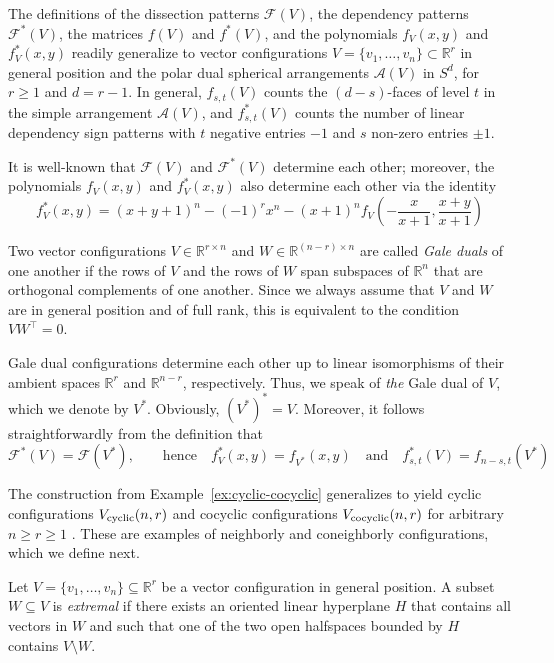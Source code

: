 \documentclass[a4paper,USenglish,cleveref, autoref, thm-restate,nolineno]{socg-lipics-v2021}
\newcommand{\arr}{\mathcal{A}}
\renewcommand{\geq}{\geqslant}
\newcommand{\R}{\mathbb{R}}
\newcommand{\cyclic}{V_{\textup{cyclic}}}
\newcommand{\cocyclic}{V_{\textup{cocyclic}}}
\begin{document}
The definitions of the dissection patterns $\mathcal{F}(V)$, the dependency patterns $\mathcal{F}^*(V)$, the matrices $f(V)$ and $f^*(V)$, and the polynomials $f_V(x,y)$ and $f^*_V(x,y)$ readily generalize to vector configurations $V=\{v_1,\dots,v_n\} \subset \R^r$ in general position and the polar dual spherical arrangements $\arr(V)$ in $S^d$, for $r\geq 1$ and $d=r-1$. In general, 
$f_{s,t}(V)$ counts the $(d-s)$-faces of level $t$ in the simple arrangement $\arr(V)$, and $f^*_{s,t}(V)$ counts the number of linear dependency sign patterns with $t$ negative entries $-1$ and $s$ non-zero entries $\pm 1$.

It is well-known that $\mathcal{F}(V)$ and $\mathcal{F}^*(V)$ determine each other; moreover, the polynomials $f_V(x,y)$ and $f^*_V(x,y)$ also determine each other \cite[Theorem~23]{SW:DS} via the identity
\begin{equation}
\label{eq:fstar-f}
f^*_V(x,y)=(x+y+1)^n - (-1)^r x^n -(x+1)^n f_V(\textstyle -\frac{x}{x+1},\frac{x+y}{x+1})
\end{equation}

 
 \begin{definition} 
\label{def:Gale}
Two vector configurations $V \in \R^{r\times n}$ and $W\in \R^{(n-r)\times n}$ are called \emph{Gale duals} of one another if the rows of $V$ and the rows of $W$ span subspaces of $\R^n$ that are orthogonal complements of one another. Since we always assume that $V$ and $W$ are in general position and of full rank, this is equivalent to the condition $VW^{\top} = 0$.
\end{definition}

Gale dual configurations determine each other up to linear isomorphisms of their ambient spaces $\R^r$ and $\R^{n-r}$, respectively. Thus, we %
speak of \emph{the} Gale dual of $V$, which we denote by $V^*$. Obviously, $(V^*)^*=V$.
Moreover, it follows straightforwardly from the definition that
\[\mathcal{F}^{*}(V)=\mathcal{F}(V^*),\qquad \textrm{hence} \quad f^*_V(x,y)=f_{V^*}(x,y) \quad \textrm{and}\quad f^*_{s,t}(V)=f_{n-s,t}(V^*)\]

The construction from Example~\ref{ex:cyclic-cocyclic} generalizes to yield cyclic configurations $\cyclic(n,r)$ and cocyclic configurations $\cocyclic(n,r)$ for arbitrary $n\geq r\geq 1$ \cite{Ziegler:1995aa,Matousek:2003aa}. These are examples of neighborly and coneighborly configurations, which we define next.

Let $V=\{v_1,\dots,v_n\} \subseteq \R^r$ be a vector configuration in general position. A subset $W\subseteq V$ is \emph{extremal} if there exists an oriented linear hyperplane $H$ that contains all vectors in $W$ and such that one of the two open halfspaces bounded by $H$ contains $V\setminus W$.
\end{document}
